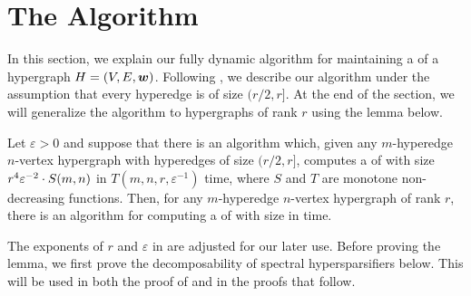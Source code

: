\section{The Algorithm}







In this section, we explain our fully dynamic algorithm for maintaining a \SpectralHypersparsifier{} of a hypergraph \( { H} = (V, E, \boldsymbol{w}) \).
Following \cite{Bansal:2019aa}, we describe our algorithm under the assumption that every hyperedge is of size \( (r/2, r] \).
At the end of the section, we will generalize the algorithm to hypergraphs of rank \( r \) using the lemma below.





\begin{lemma} \label{lem:r/2}
Let \( \varepsilon > 0 \) and suppose that there is an algorithm which, given any \( m \)-hyperedge \( n \)-vertex hypergraph  with hyperedges of size \( (r/2, r ] \), computes a \SpectralHypersparsifier{} of  with size  
\( 
 r^{4} \varepsilon^{ - 2 } \cdot S(m, n) \)
 in \( T(m, n, r, \varepsilon ^{-1}) \) time, where \( S \) and \( T \) are  monotone non-decreasing functions.
Then, for any \( m \)-hyperedge \( n \)-vertex hypergraph  of rank \( r \), there is an algorithm for computing a \SpectralHypersparsifier{} of  with size  in  time.
\end{lemma}

The exponents of \( r \) and \( \varepsilon \) in  are adjusted for our later use. 
Before proving the lemma, we first prove the decomposability of spectral hypersparsifiers below.
This will be used in both the proof of  and in the proofs that follow. 



